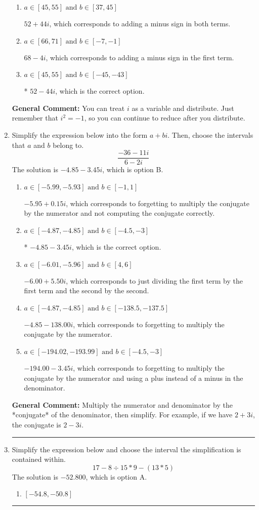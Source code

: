 \documentclass{extbook}[14pt]
\newcommand{\litem}[1]{\item #1

\rule{\textwidth}{0.4pt}}
\begin{document}
\begin{enumerate}
{\begin{enumerate}[label=\Alph*.]
 $68 + 4 i$, which corresponds to adding a minus sign in the second term.
\item \( a \in [45, 55] \text{ and } b \in [37, 45] \)

 $52 + 44 i$, which corresponds to adding a minus sign in both terms.
\item \( a \in [66, 71] \text{ and } b \in [-7, -1] \)

 $68 - 4 i$, which corresponds to adding a minus sign in the first term.
\item \( a \in [45, 55] \text{ and } b \in [-45, -43] \)

* $52 - 44 i$, which is the correct option.
\end{enumerate}

\textbf{General Comment:} You can treat $i$ as a variable and distribute. Just remember that $i^2=-1$, so you can continue to reduce after you distribute.
}
\litem{
Simplify the expression below into the form $a+bi$. Then, choose the intervals that $a$ and $b$ belong to.
\[ \frac{-36 - 11 i}{6 - 2 i} \]The solution is \( -4.85  - 3.45 i \), which is option B.\begin{enumerate}[label=\Alph*.]
\item \( a \in [-5.99, -5.93] \text{ and } b \in [-1, 1] \)

 $-5.95  + 0.15 i$, which corresponds to forgetting to multiply the conjugate by the numerator and not computing the conjugate correctly.
\item \( a \in [-4.87, -4.85] \text{ and } b \in [-4.5, -3] \)

* $-4.85  - 3.45 i$, which is the correct option.
\item \( a \in [-6.01, -5.96] \text{ and } b \in [4, 6] \)

 $-6.00  + 5.50 i$, which corresponds to just dividing the first term by the first term and the second by the second.
\item \( a \in [-4.87, -4.85] \text{ and } b \in [-138.5, -137.5] \)

 $-4.85  - 138.00 i$, which corresponds to forgetting to multiply the conjugate by the numerator.
\item \( a \in [-194.02, -193.99] \text{ and } b \in [-4.5, -3] \)

 $-194.00  - 3.45 i$, which corresponds to forgetting to multiply the conjugate by the numerator and using a plus instead of a minus in the denominator.
\end{enumerate}

\textbf{General Comment:} Multiply the numerator and denominator by the *conjugate* of the denominator, then simplify. For example, if we have $2+3i$, the conjugate is $2-3i$.
}
\litem{
Simplify the expression below and choose the interval the simplification is contained within.
\[ 17 - 8 \div 15 * 9 - (13 * 5) \]The solution is \( -52.800 \), which is option A.\begin{enumerate}[label=\Alph*.]
\item \( [-54.8, -50.8] \)


\end{enumerate}}
\end{enumerate}
\end{document}
